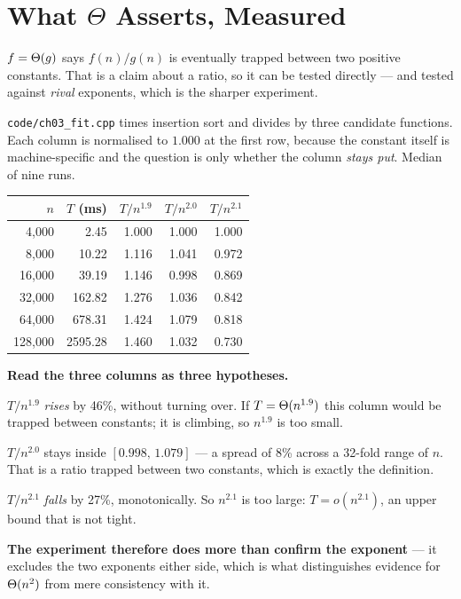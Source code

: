 \section{What \texorpdfstring{$\Theta$}{Theta} Asserts, Measured}

$f = \Theta(g)$ says $f(n)/g(n)$ is eventually trapped between two positive
constants. That is a claim about a ratio, so it can be tested directly --- and
tested against \emph{rival} exponents, which is the sharper experiment.

\begin{worked}
\texttt{code/ch03\_fit.cpp} times insertion sort and divides by three candidate
functions. Each column is normalised to $1.000$ at the first row, because the
constant itself is machine-specific and the question is only whether the column
\emph{stays put}. Median of nine runs.

\begin{center}
\begin{tabular}{@{}rrrrr@{}}
\toprule
\rowcolor{primary!15}
$n$ & $T$ (ms) & $T/n^{1.9}$ & $T/n^{2.0}$ & $T/n^{2.1}$ \\
\midrule
  4{,}000 &    2.45 & 1.000 & 1.000 & 1.000 \\
  8{,}000 &   10.22 & 1.116 & 1.041 & 0.972 \\
 16{,}000 &   39.19 & 1.146 & 0.998 & 0.869 \\
 32{,}000 &  162.82 & 1.276 & 1.036 & 0.842 \\
 64{,}000 &  678.31 & 1.424 & 1.079 & 0.818 \\
128{,}000 & 2595.28 & 1.460 & 1.032 & 0.730 \\
\bottomrule
\end{tabular}
\end{center}

\smallskip
\textbf{Read the three columns as three hypotheses.}
\begin{tight}
  \item $T/n^{1.9}$ \emph{rises} by 46\%, without turning over. If
        $T = \Theta(n^{1.9})$ this column would be trapped between constants;
        it is climbing, so $n^{1.9}$ is too small.
  \item $T/n^{2.0}$ stays inside $[0.998,\, 1.079]$ --- a spread of 8\% across
        a 32-fold range of $n$. That is a ratio trapped between two
        constants, which is exactly the definition.
  \item $T/n^{2.1}$ \emph{falls} by 27\%, monotonically. So $n^{2.1}$ is too
        large: $T = o(n^{2.1})$, an upper bound that is not tight.
\end{tight}

\smallskip
\textbf{The experiment therefore does more than confirm the exponent} --- it
excludes the two exponents either side, which is what distinguishes evidence
for $\Theta(n^{2})$ from mere consistency with it.
\end{worked}


